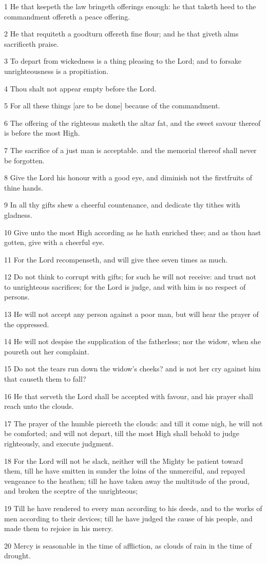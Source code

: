 \par 1 He that keepeth the law bringeth offerings enough: he that taketh heed to the commandment offereth a peace offering.
\par 2 He that requiteth a goodturn offereth fine flour; and he that giveth alms sacrificeth praise.
\par 3 To depart from wickedness is a thing pleasing to the Lord; and to forsake unrighteousness is a propitiation.
\par 4 Thou shalt not appear empty before the Lord.
\par 5 For all these things [are to be done] because of the commandment.
\par 6 The offering of the righteous maketh the altar fat, and the sweet savour thereof is before the most High.
\par 7 The sacrifice of a just man is acceptable. and the memorial thereof shall never be forgotten.
\par 8 Give the Lord his honour with a good eye, and diminish not the firstfruits of thine hands.
\par 9 In all thy gifts shew a cheerful countenance, and dedicate thy tithes with gladness.
\par 10 Give unto the most High according as he hath enriched thee; and as thou hast gotten, give with a cheerful eye.
\par 11 For the Lord recompenseth, and will give thee seven times as much.
\par 12 Do not think to corrupt with gifts; for such he will not receive: and trust not to unrighteous sacrifices; for the Lord is judge, and with him is no respect of persons.
\par 13 He will not accept any person against a poor man, but will hear the prayer of the oppressed.
\par 14 He will not despise the supplication of the fatherless; nor the widow, when she poureth out her complaint.
\par 15 Do not the tears run down the widow's cheeks? and is not her cry against him that causeth them to fall?
\par 16 He that serveth the Lord shall be accepted with favour, and his prayer shall reach unto the clouds.
\par 17 The prayer of the humble pierceth the clouds: and till it come nigh, he will not be comforted; and will not depart, till the most High shall behold to judge righteously, and execute judgment.
\par 18 For the Lord will not be slack, neither will the Mighty be patient toward them, till he have smitten in sunder the loins of the unmerciful, and repayed vengeance to the heathen; till he have taken away the multitude of the proud, and broken the sceptre of the unrighteous;
\par 19 Till he have rendered to every man according to his deeds, and to the works of men according to their devices; till he have judged the cause of his people, and made them to rejoice in his mercy.
\par 20 Mercy is seasonable in the time of affliction, as clouds of rain in the time of drought.

